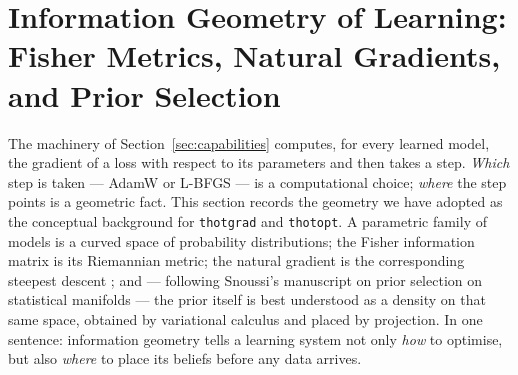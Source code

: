 \section{Information Geometry of Learning: Fisher Metrics, Natural Gradients,
and Prior Selection}
\label{sec:info-geo}

The machinery of Section~\ref{sec:capabilities} computes, for every learned
model, the gradient of a loss with respect to its parameters and then takes a
step. \emph{Which} step is taken --- AdamW or L-BFGS --- is a computational
choice; \emph{where} the step points is a geometric fact. This section
records the geometry we have adopted as the conceptual background for
\texttt{thotgrad} and \texttt{thotopt}. A parametric family of models is a
curved space of probability distributions; the Fisher information matrix is
its Riemannian metric; the natural gradient is the corresponding steepest
descent \cite{amari1998,amari1985}; and --- following Snoussi's manuscript on
prior selection on
statistical manifolds --- the prior itself is best understood as a density on
that same space, obtained by variational calculus and placed by projection.
In one sentence: information geometry tells a learning system not only
\emph{how} to optimise, but also \emph{where} to place its beliefs before any
data arrives.

